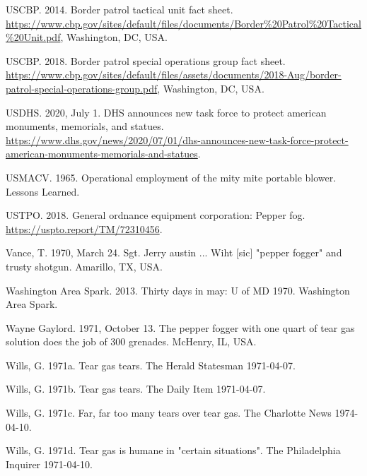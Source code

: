 \documentclass[
  11pt,
]{krantz}
\newlength{\cslhangindent}
\newlength{\cslentryspacingunit} %
\newenvironment{CSLReferences}[2] %
 {%
  \setlength{\parindent}{0pt}
  \ifodd #1
  \let\oldpar\par
  \def\par{\hangindent=\cslhangindent\oldpar}
  \fi
  \setlength{\parskip}{#2\cslentryspacingunit}
 }%
 {}
\begin{document}
\begin{CSLReferences}{1}{0}
\leavevmode{}%
USCBP. 2014. Border patrol tactical unit fact sheet. \url{https://www.cbp.gov/sites/default/files/documents/Border\%20Patrol\%20Tactical\%20Unit.pdf}, Washington, DC, USA.

\leavevmode{}%
USCBP. 2018. Border patrol special operations group fact sheet. \url{https://www.cbp.gov/sites/default/files/assets/documents/2018-Aug/border-patrol-special-operations-group.pdf}, Washington, DC, USA.

\leavevmode{}%
USDHS. 2020, July 1. DHS announces new task force to protect american monuments, memorials, and statues. \url{https://www.dhs.gov/news/2020/07/01/dhs-announces-new-task-force-protect-american-monuments-memorials-and-statues}.

\leavevmode{}%
USMACV. 1965. Operational employment of the mity mite portable blower. Lessons Learned.

\leavevmode{}%
USTPO. 2018. General ordnance equipment corporation: Pepper fog. \url{https://uspto.report/TM/72310456}.

\leavevmode{}%
Vance, T. 1970, March 24. Sgt. Jerry austin ... Wiht {[}sic{]} "pepper fogger" and trusty shotgun. Amarillo, TX, USA.

\leavevmode{}%
Washington Area Spark. 2013. Thirty days in may: U of MD 1970. {Washington Area Spark}.

\leavevmode{}%
Wayne Gaylord. 1971, October 13. The pepper fogger with one quart of tear gas solution does the job of 300 grenades. McHenry, IL, USA.

\leavevmode{}%
Wills, G. 1971a. Tear gas tears. The Herald Statesman 1971-04-07.

\leavevmode{}%
Wills, G. 1971b. Tear gas tears. The Daily Item 1971-04-07.

\leavevmode{}%
Wills, G. 1971c. Far, far too many tears over tear gas. The Charlotte News 1974-04-10.

\leavevmode{}%
Wills, G. 1971d. Tear gas is humane in "certain situations". The Philadelphia Inquirer 1971-04-10.


\end{CSLReferences}
\end{document}
